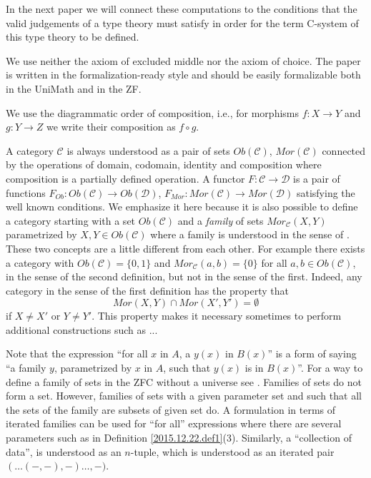 \documentclass[12pt]{amsart}
\newcommand{\sr}{\rightarrow}
\newcommand{\C}{{\mathcal C}}
\newcommand{\D}{{\mathcal D}}
\begin{document}
In the next paper we will connect these computations to the conditions that the valid judgements of a type theory must satisfy in order for the term C-system of this type theory to be defined. 

\vspace{5mm}

We use neither the axiom of excluded middle nor the axiom of choice. The paper is written in the formalization-ready style and should be easily formalizable both in the UniMath and in the ZF. 

\vspace{5mm}

We use the diagrammatic order of composition, i.e., for morphisms $f:X\sr Y$ and $g:Y\sr Z$ we write their composition as $f\circ g$. 

A category $\C$ is always understood as a pair of sets $Ob(\C)$, $Mor(\C)$ connected by the operations of domain, codomain, identity and composition where composition is a partially defined operation. A functor $F:\C\sr \D$ is a pair of functions $F_{Ob}:Ob(\C)\sr Ob(\D)$, $F_{Mor}:Mor(\C)\sr Mor(\D)$ satisfying the well known conditions. We emphasize it here because it is also possible to define a category starting with a set $Ob(\C)$ and a {\em family} of sets $Mor_{\C}(X,Y)$ parametrized by $X,Y\in Ob(\C)$ where a {family} is understood in the sense of \cite[Remark 3.9]{fromunivwithPiI}. These two concepts are a little different from each other. For example there exists a category with $Ob(\C)=\{0,1\}$ and $Mor_{\C}(a,b)=\{0\}$ for all $a,b\in Ob(\C)$, in the sense of the second definition, but not in the sense of the first. Indeed, any category in the sense of the first definition has the property that 
%
$$Mor(X,Y)\cap Mor(X',Y')=\emptyset$$
%
if $X\ne X'$ or $Y\ne Y'$. This property makes it necessary sometimes to perform additional constructions such as ... %


Note that the expression ``for all $x$ in $A$, a $y(x)$ in $B(x)$'' is a form of saying ``a family $y$, parametrized by $x$ in $A$, such that  $y(x)$ is in $B(x)$''. For a way to define a family of sets in the ZFC without a universe see \cite[Remark 3.9]{fromunivwithPiI}. Families of sets do not form a set. However, families of sets with a given parameter set and such that all the sets of the family are subsets of given set do. A formulation in terms of iterated families can be used for ``for all'' expressions where there are  several parameters such as in Definition  \ref{2015.12.22.def1}(3). Similarly, a ``collection of data'', is understood as an $n$-tuple, which is understood as an iterated pair $(\dots(-,-),-)\dots,-)$.
\end{document}
